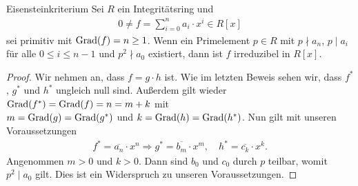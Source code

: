 \begin{genericthm}{Eisensteinkriterium}\label{skript:10.4}
	Sei $ R $ ein Integritätsring und 
	\begin{align*}
	0 \neq f = \sum \limits_{i = 0}^n a_i \cdot x^i \in R[x]
	\end{align*}
	sei  primitiv mit $ \operatorname{Grad}(f) = n \geq 1  $.
	Wenn ein Primelement $ p \in R $ mit $ p \nmid a_n $, $ p \mid a_i $ für alle $ 0 \leq i \leq n-1 $
	und $ p^2 \nmid a_0 $ existiert, dann ist $ f $ irreduzibel in $ R[x] $.
\end{genericthm}

\begin{proof}
	Wir nehmen an, dass $ f = g \cdot h $ ist.
	Wie im letzten Beweis sehen wir, dass $ f^\ast  $, $ g^\ast  $ und $ h^\ast  $ ungleich null sind.
	Außerdem gilt wieder $ \operatorname{Grad}(f^\ast) = \operatorname{Grad}(f) = n = m + k $
	mit \\
	$ m = \operatorname{Grad}(g)  = \operatorname{Grad}(g^\ast)$ und $ k = \operatorname{Grad}(h) = \operatorname{Grad}(h^\ast) $.
	Nun gilt mit unseren Voraussetzungen
	\begin{align*}
	f^\ast = \overline{a_n} \cdot x^n 
	\Rightarrow
	g^\ast= \overline{b_m} \cdot x^m, \quad h^\ast = \overline{c_k} \cdot x^k.
	\end{align*}
	Angenommen $ m > 0 $ und $ k > 0  $.
	Dann sind $ b_0 $ und $ c_0 $ durch $ p $ teilbar, womit $ p^2 \mid a_0 $ gilt.
	Dies ist ein Widerspruch zu unseren Voraussetzungen.
\end{proof}

